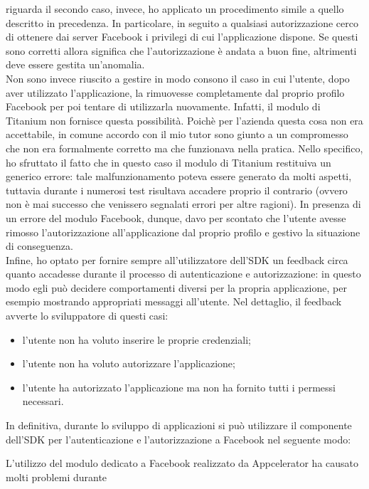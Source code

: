 				riguarda il secondo caso, invece, ho applicato un procedimento simile a quello descritto in precedenza. In
				particolare, in seguito a qualsiasi autorizzazione cerco di ottenere dai server Facebook i privilegi di cui
				l'applicazione dispone. Se questi sono corretti allora significa che l'autorizzazione è andata a buon fine,
				altrimenti deve essere gestita un'anomalia.\\
				Non sono invece riuscito a gestire in modo consono il caso in cui l'utente, dopo aver utilizzato l'applicazione, la
				rimuovesse completamente dal proprio profilo Facebook per poi tentare di utilizzarla nuovamente. Infatti, il modulo
				di Titanium non fornisce questa possibilità. Poichè per l'azienda questa cosa non era accettabile, in comune accordo
				con il mio tutor sono giunto a un compromesso che non era formalmente corretto ma che funzionava nella pratica. Nello
				specifico, ho sfruttato il fatto che in questo caso il modulo di Titanium restituiva un generico errore: tale
				malfunzionamento poteva essere generato da molti aspetti, tuttavia durante i numerosi test risultava accadere proprio
				il contrario (ovvero non è mai successo che venissero segnalati errori per altre ragioni). In presenza di un errore
				del modulo Facebook, dunque, davo per scontato che l'utente avesse rimosso l'autorizzazione all'applicazione dal
				proprio profilo e gestivo la situazione di conseguenza.\\
				Infine, ho optato per fornire sempre all'utilizzatore dell'SDK un feedback circa quanto accadesse durante il
				processo di autenticazione e autorizzazione: in questo modo egli può decidere comportamenti diversi per la propria
				applicazione, per esempio mostrando appropriati messaggi all'utente. Nel dettaglio, il feedback avverte lo
				sviluppatore di questi casi:
				\begin{itemize}
					\item l'utente non ha voluto inserire le proprie credenziali;
					\item l'utente non ha voluto autorizzare l'applicazione;
					\item l'utente ha autorizzato l'applicazione ma non ha fornito tutti i permessi necessari.
				\end{itemize}
				In definitiva, durante lo sviluppo di applicazioni si può utilizzare il componente dell'SDK per l'autenticazione e
				l'autorizzazione a Facebook nel seguente modo:
				
				L'utilizzo del modulo dedicato a Facebook realizzato da Appcelerator ha causato molti problemi durante
